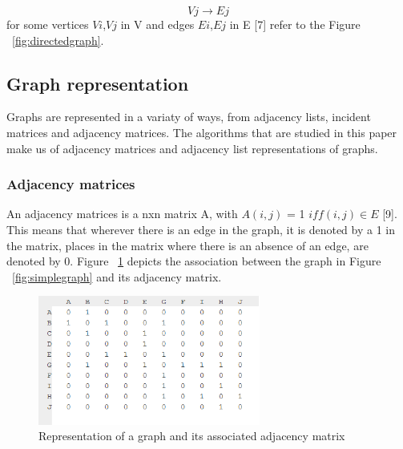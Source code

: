   \begin{equation}
    Vj\rightarrow Ej
  \end{equation} 
   for some vertices $Vi$,$Vj$ in V and edges $Ei$,$Ej$ in E [7] refer to the Figure ~\ref{fig:directedgraph}.

\subsection{Graph representation}
Graphs are represented in a variaty of ways, from adjacency lists, incident matrices and adjacency matrices. The algorithms that are studied in this paper make us of adjacency matrices and adjacency list representations of graphs. 

\subsubsection{Adjacency matrices}
An adjacency matrices is a nxn matrix A, with $A(i,j)$ = 1 $iff(i,j) ∈ E$ [9]. This means that wherever there is an edge in the graph, it is denoted by a 1 in the matrix, places in the matrix where there is an absence of an edge, are denoted by 0.\newline\newline
Figure ~\ref{fig:adjacencymatrix} depicts the association between the graph in Figure ~\ref{fig:simplegraph} and its adjacency matrix.
\begin{figure}[H]
  \begin{center}
      \includegraphics[width=0.65\textwidth]{matrix.png}
  \end{center}    
  \caption{Representation of a graph and its associated adjacency matrix}
  \label{fig:adjacencymatrix}
\end{figure}

\newpage

